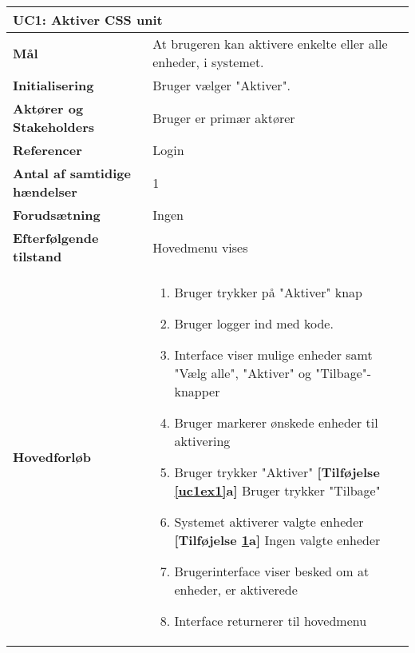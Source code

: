 \begin{table}[H] \centering
	\begin{tabular} {|p{6cm}|p{8cm}|}
	\hline
		\multicolumn{2}{|l|}{\textbf{UC1: Aktiver CSS unit}} \\\hline
		
		\textbf{Mål}							&At brugeren kan aktivere enkelte eller alle enheder, i systemet.	\\\hline
		\textbf{Initialisering}				&Bruger vælger "Aktiver". 								\\\hline
		\textbf{Aktører og Stakeholders}		&Bruger er primær aktører 							\\\hline
		\textbf{Referencer}					&Login														\\\hline
		\textbf{Antal af samtidige hændelser}&1 																\\\hline
		\textbf{Forudsætning}				&Ingen														\\\hline
		\textbf{Efterfølgende tilstand}		&Hovedmenu vises 								\\\hline
		\textbf{Hovedforløb}					
			&\begin{enumerate}
	
				\item Bruger trykker på "Aktiver" knap
				
				\item Bruger logger ind med kode.
										
				\item Interface viser mulige enheder samt "Vælg alle", "Aktiver" og "Tilbage"-knapper
												
				\item \label{uc1select} Bruger markerer ønskede enheder til aktivering
												
				\item \label{uc1ex1} Bruger trykker "Aktiver"\newline
					\textbf{[Tilføjelse \ref{uc1ex1}a]} Bruger trykker "Tilbage"
												
				\item \label{uc1ex2} Systemet aktiverer valgte enheder\newline
					\textbf{[Tilføjelse \ref{uc1ex2}a]} Ingen valgte enheder
				
				\item Brugerinterface viser besked om at enheder, er aktiverede
																	
				\item Interface returnerer til hovedmenu
												

\end{enumerate}
\end{tabular}
\end{table}
